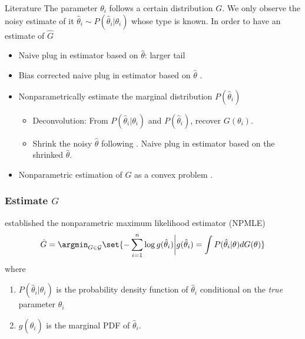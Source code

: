 \documentclass[10pt, aspectratio=169]{beamer}
\begin{document}
\begin{frame}{Literature}
  The parameter $\theta_i$ follows a certain distribution $G$. We only observe the noisy estimate of it $\hat{\theta}_i \sim P(\hat{\theta}_i|\theta_i)$ whose type is known. In order to have an estimate of $\hat{G}$
  \begin{itemize}
    \item Naive plug in estimator based on $\hat{\theta}$: \alert{larger tail}
    \item Bias corrected naive plug in estimator based on $\hat{\theta}$
          \citep{jochmans2024inference}.
    \item Nonparametrically estimate the marginal distribution $P(\hat{\theta}_i)$
          \begin{itemize}
            \item Deconvolution: From $P(\hat{\theta}_i|\theta_i)$ and $P(\hat{\theta}_i)$,
                  recover $G(\theta_i)$.
            \item Shrink the noisy $\hat{\theta}$ following \citet{robbins1956empirical}. Naive
                  plug in estimator based on the shrinked $\hat{\theta}$.
          \end{itemize}
    \item Nonparametric estimation of $G$ as a convex problem
          \citep{kiefer1956consistency,koenker2014convex}.
  \end{itemize}

\end{frame}

\begin{frame}[fragile]\frametitle{Estimate $G$}

  \citet{kiefer1956consistency} established the nonparametric maximum likelihood estimator (NPMLE)
  \begin{equation*}
    \hat{G}=\argmin_{G\in \mathcal{G}} \set{-\sum_{i=1}^{n}\log g(\hat{\theta}_i)\bigg | g(\hat{\theta}_i)=\int  P(\hat{\theta}_i |\theta)dG(\theta) }
  \end{equation*}
  where
  \begin{enumerate}
    \item $P(\hat{\theta}_i |\theta_i)$ is the probability density function of $\hat{\theta}_i$ conditional on the \textit{true} parameter $\theta_i$
    \item $g(\hat{\theta}_i)$ is the marginal PDF of $\hat{\theta}_i$.
  \end{enumerate}
\end{frame}
\end{document}
